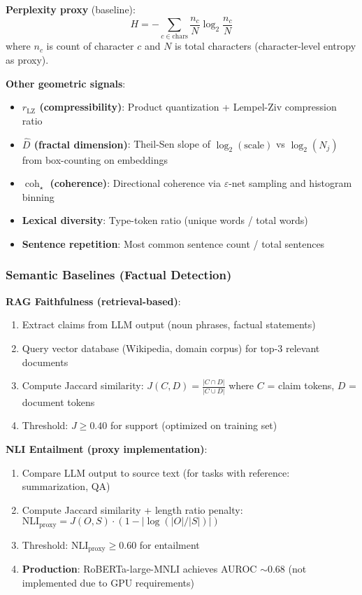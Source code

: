 \documentclass[11pt]{article}
\begin{document}
\textbf{Perplexity proxy} (baseline):
\begin{equation}
H = -\sum_{c \in \text{chars}} \frac{n_c}{N} \log_2 \frac{n_c}{N}
\end{equation}
where $n_c$ is count of character $c$ and $N$ is total characters (character-level entropy as proxy).

\textbf{Other geometric signals}:
\begin{itemize}
\item \textbf{$r_{\text{LZ}}$ (compressibility)}: Product quantization + Lempel-Ziv compression ratio
\item \textbf{$\hat{D}$ (fractal dimension)}: Theil-Sen slope of $\log_2(\text{scale})$ vs $\log_2(N_j)$ from box-counting on embeddings
\item \textbf{$\operatorname{coh}_\star$ (coherence)}: Directional coherence via $\varepsilon$-net sampling and histogram binning
\item \textbf{Lexical diversity}: Type-token ratio (unique words / total words)
\item \textbf{Sentence repetition}: Most common sentence count / total sentences
\end{itemize}

\subsubsection{Semantic Baselines (Factual Detection)}

\textbf{RAG Faithfulness (retrieval-based)}:
\begin{enumerate}
\item Extract claims from LLM output (noun phrases, factual statements)
\item Query vector database (Wikipedia, domain corpus) for top-3 relevant documents
\item Compute Jaccard similarity: $J(C, D) = \frac{|C \cap D|}{|C \cup D|}$ where $C$ = claim tokens, $D$ = document tokens
\item Threshold: $J \geq 0.40$ for support (optimized on training set)
\end{enumerate}

\textbf{NLI Entailment (proxy implementation)}:
\begin{enumerate}
\item Compare LLM output to source text (for tasks with reference: summarization, QA)
\item Compute Jaccard similarity + length ratio penalty: $\text{NLI}_{\text{proxy}} = J(O, S) \cdot (1 - |\log(|O|/|S|)|)$
\item Threshold: $\text{NLI}_{\text{proxy}} \geq 0.60$ for entailment
\item \textbf{Production}: RoBERTa-large-MNLI achieves AUROC $\sim$0.68 (not implemented due to GPU requirements)
\end{enumerate}
\end{document}
